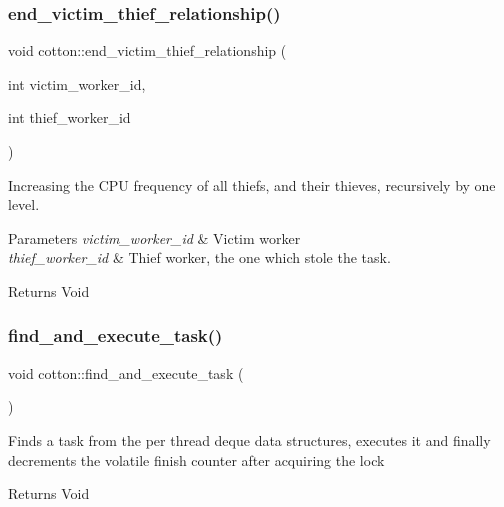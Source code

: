 \subsubsection{\texorpdfstring{end\+\_\+victim\+\_\+thief\+\_\+relationship()}{end\_victim\_thief\_relationship()}}
{\footnotesize\ttfamily void cotton\+::end\+\_\+victim\+\_\+thief\+\_\+relationship (\begin{DoxyParamCaption}\item[{int}]{victim\+\_\+worker\+\_\+id,  }\item[{int}]{thief\+\_\+worker\+\_\+id }\end{DoxyParamCaption})}

Increasing the C\+PU frequency of all thiefs, and their thieves, recursively by one level.


\begin{DoxyParams}{Parameters}
{\em victim\+\_\+worker\+\_\+id} & Victim worker \\
\hline
{\em thief\+\_\+worker\+\_\+id} & Thief worker, the one which stole the task.\\
\hline
\end{DoxyParams}
\begin{DoxyReturn}{Returns}
Void 
\end{DoxyReturn}
\mbox{\label{cotton-runtime_8h_file_af22caee9434a7e06a09b2f9a0417c1eb}} 
\subsubsection{\texorpdfstring{find\+\_\+and\+\_\+execute\+\_\+task()}{find\_and\_execute\_task()}}
{\footnotesize\ttfamily void cotton\+::find\+\_\+and\+\_\+execute\+\_\+task (\begin{DoxyParamCaption}{ }\end{DoxyParamCaption})}

Finds a task from the per thread deque data structures, executes it and finally decrements the volatile finish counter after acquiring the lock

\begin{DoxyReturn}{Returns}
Void 
\end{DoxyReturn}
\mbox{\label{cotton-runtime_8h_file_ad169fe95f5f03bdfa569dd365dde6c12}} 
